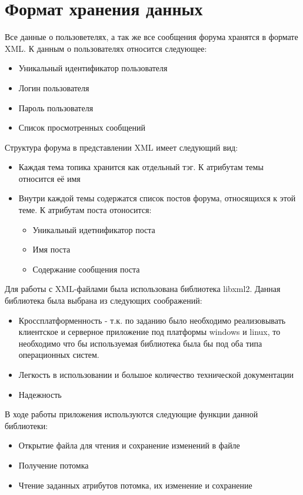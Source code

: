 \documentclass[10pt,a4paper]{report}
\begin{document}
\section{Формат хранения данных}
Все данные о пользоветелях, а так же все сообщения форума хранятся в формате XML. К данным о пользователях относится следующее:
\begin{itemize}
\item Уникальный идентификатор пользователя
\item Логин пользователя
\item Пароль пользователя
\item Список просмотренных сообщений
\end{itemize}
Структура форума в представлении XML имеет следующий вид:
\begin{itemize}
\item Каждая тема топика хранится как отдельный тэг. К атрибутам темы относится её имя
\item Внутри каждой темы содержатся список постов форума, относящихся к этой теме. К атрибутам поста отоносится:
\begin{itemize}
\item Уникальный идетнификатор поста
\item Имя поста
\item Содержание сообщения поста
\end{itemize}
\end{itemize}
Для работы с XML-файлами была использована библиотека libxml2. Данная библиотека была выбрана из следующих соображений:
\begin{itemize}
\item Кроссплатформенность - т.к. по заданию было необходимо реализовывать клиентское и серверное приложение под платформы windows и linux, то необходимо что бы используемая библиотека была бы под оба типа операционных систем.
\item Легкость в использовании и большое количество технической документации
\item Надежность
\end{itemize}
В ходе работы приложения используются следующие функции данной библиотеки:
\begin{itemize}
\item Открытие файла для чтения и сохранение изменений в файле
\item Получение потомка
\item Чтение заданных атрибутов потомка, их изменение и сохранение
\end{itemize}
\end{document}
